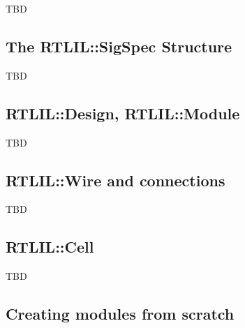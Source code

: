 \begin{frame}{\subsecname}
TBD
\end{frame}


\subsection{The RTLIL::SigSpec Structure}

\begin{frame}{\subsecname}
TBD
\end{frame}


\subsection{RTLIL::Design, RTLIL::Module}

\begin{frame}{\subsecname}
TBD
\end{frame}


\subsection{RTLIL::Wire and connections}

\begin{frame}{\subsecname}
TBD
\end{frame}


\subsection{RTLIL::Cell}

\begin{frame}{\subsecname}
TBD
\end{frame}


\subsection{Creating modules from scratch}

